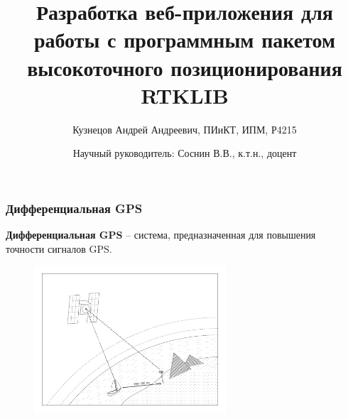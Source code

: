 \documentclass[xetex,с,aspectratio=169]{beamer}
\title{Разработка веб-приложения для работы с программным пакетом высокоточного позиционирования RTKLIB}
\author[Кузнецов А.А., P3410]{Кузнецов Андрей Андреевич, ПИиКТ, ИПМ, Р4215}
\date[]{Научный руководитель: Соснин В.В., к.т.н., доцент}
\begin{document}
%
%
{

  \begin{frame}
    \titlepage
  \end{frame}
}


%
%
\begin{frame}
  \frametitle{Дифференциальная GPS}
  
  \large

  \begin{center}
    \textbf{Дифференциальная GPS} -- система, предназначенная для повышения\\точности сигналов GPS.
  \end{center}

  \vskip -0.25cm

  \begin{figure}[h]
    \centering
    \includegraphics[height=5.5cm]{../img/tikz/dgps-one/pic}
  \end{figure}
\end{frame}
\end{document}
